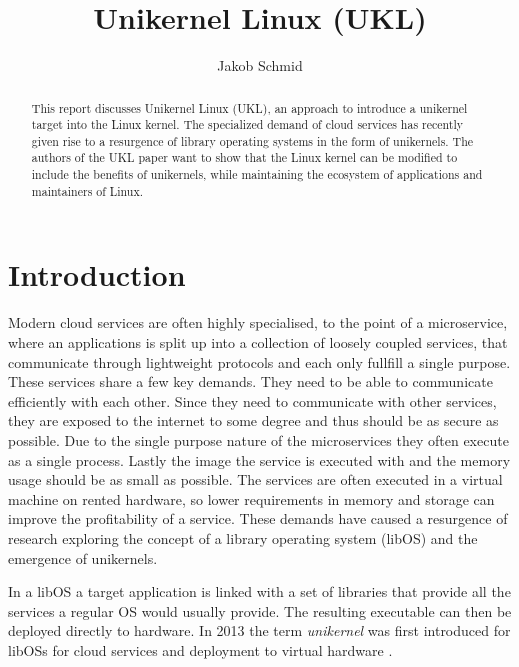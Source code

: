 \documentclass[10pt,twocolumn,a4paper]{article}
\author{Jakob Schmid}
\begin{document}
\title{Unikernel Linux (UKL)}

\newcommand{\todo}[1]{{\texttt{[#1]}}}
\newcommand{\code}[1]{{\tt \small{#1}}}
\newcommand{\refsec}[1]{{§ \ref{#1}}}

\maketitle

\begin{abstract}
  This report discusses Unikernel Linux (UKL), an approach to introduce a
  unikernel target into the Linux kernel.
  The specialized demand of cloud services has recently given rise
  to a resurgence of library operating systems in the form of unikernels.
  The authors of the UKL paper want to show that the Linux kernel can be
  modified to include the benefits of unikernels, while maintaining the
  ecosystem of applications and maintainers of Linux.
\end{abstract}

\section{Introduction}\label{sec:introduction}
  Modern cloud services are often highly specialised, to the point of a microservice, 
  where an applications is split up into a collection of loosely coupled services,
  that communicate through lightweight protocols and each only fullfill a single purpose.
  These services share a few key demands. They need to be able to communicate 
  efficiently with each other. Since they need to communicate with other services,
  they are exposed to the internet to some degree and thus should be as secure as possible.
  Due to the single purpose nature of the microservices they often execute as a single process.
  Lastly the image the service is executed with and the memory usage should be as small as possible.
  The services are often executed in a virtual machine on rented hardware, so lower requirements
  in memory and storage can improve the profitability of a service.
  These demands have caused a resurgence of research exploring the concept of 
  a library operating system (libOS) and the emergence of unikernels. 

  In a libOS a target application is linked with a set of
  libraries that provide all the services a regular OS would usually provide.
  The resulting executable can then be deployed directly to hardware.
  In 2013 the term \textit{unikernel} was first introduced for libOSs
  for cloud services and deployment to virtual hardware \cite{madhavapeddy13}.
\end{document}
